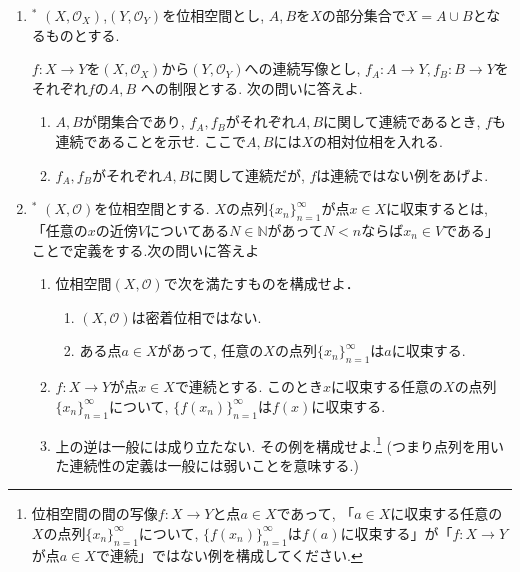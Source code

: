 \documentclass[dvipdfmx,a4paper,11pt]{article}
\newcommand{\N}{\mathbb{N}}
\theoremstyle{definition}
\begin{document}
\begin{enumerate}[ label=\textbf{問}3.\arabic*]
 \item$^*$  $(X, \mathscr{O}_X)$,$(Y, \mathscr{O}_Y)$を位相空間とし, $A,B$を$X$の部分集合で$X = A \cup B$となるものとする.
 
 $f : X \rightarrow Y$を$(X, \mathscr{O}_X)$から$(Y, \mathscr{O}_Y)$への連続写像とし, $f_{A}: A \rightarrow Y, f_{B}: B \rightarrow Y$をそれぞれ$f$の$A, B$ への制限とする. 
 次の問いに答えよ.
	\begin{enumerate}
	\item $A,B$が閉集合であり, $f_A,f_B$がそれぞれ$A,B$に関して連続であるとき, $f$も連続であることを示せ. ここで$A,B$には$X$の相対位相を入れる.
	\item $f_A,f_B$がそれぞれ$A,B$に関して連続だが, $f$は連続ではない例をあげよ.
	\end{enumerate}

	
\item $^*$  $(X, \mathscr{O})$を位相空間とする.
$X$の点列$\{ x_n\}_{n =1}^{\infty}$が点$x\in X$に収束するとは, 「任意の$x$の近傍$V$についてある$N \in \N$があって$N<n$ならば$x_n \in V$である」ことで定義をする.次の問いに答えよ
 	\begin{enumerate}
	\item 位相空間$(X, \mathscr{O})$で次を満たすものを構成せよ．
		\begin{enumerate}
		\item $(X, \mathscr{O})$は密着位相ではない.
		\item ある点$a \in X$があって, 任意の$X$の点列$\{ x_n\}_{n =1}^{\infty}$は$a$に収束する.
		\end{enumerate}
	\item $f :X\rightarrow Y$が点$x\in X$で連続とする. このとき$x$に収束する任意の$X$の点列$\{ x_n\}_{n =1}^{\infty}$について, $\{ f(x_n)\}_{n =1}^{\infty}$は$f(x)$に収束する.
	\item 上の逆は一般には成り立たない. その例を構成せよ.\footnote{位相空間の間の写像$f :X\rightarrow Y$と点$a \in X$であって, 「$a \in X$に収束する任意の$X$の点列$\{ x_n\}_{n =1}^{\infty}$について, $\{ f(x_n)\}_{n =1}^{\infty}$は$f(a)$に収束する」が「$f :X\rightarrow Y$が点$a\in X$で連続」ではない例を構成してください.}
	(つまり点列を用いた連続性の定義は一般には弱いことを意味する.)
	\end{enumerate}
 \end{enumerate}


 
\end{document}
